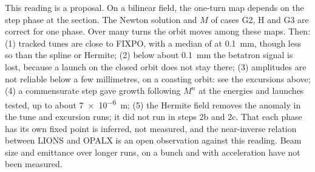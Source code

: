 \begin{reading}
This reading is a proposal.
On a bilinear field, the one-turn map depends on the step phase at the section.
The Newton solution and $M$ of cases G2, H and G3 are correct for one phase.
Over many turns the orbit moves among these maps.
Then:
(1) tracked tunes are close to FIXPO, with a median of \GThreeTenthFixMed{} at \SI{0.1}{mm}, though less so than the spline or Hermite;
(2) below about \SI{0.1}{mm} the betatron signal is lost, because a launch on the closed orbit does not stay there;
(3) amplitudes are not reliable below a few millimetres, on a coasting orbit: see the excursions above;
(4) a commensurate step gave growth following $M^n$ at the energies and launches tested, up to about \SI{7e-6}{m};
(5) the Hermite field removes the anomaly in the tune and excursion runs; it did not run in steps 2b and 2c.
That each phase has its own fixed point is inferred, not measured, and the near-inverse relation between LIONS and OPALX is an open observation against this reading.
Beam size and emittance over longer runs, on a bunch and with acceleration have not been measured.
\end{reading}
